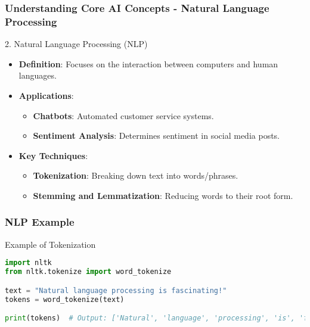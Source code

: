 \documentclass[aspectratio=169]{beamer}
\begin{document}
\begin{frame}[fragile]
    \frametitle{Understanding Core AI Concepts - Natural Language Processing}
    \begin{block}{2. Natural Language Processing (NLP)}
        \begin{itemize}
            \item \textbf{Definition}: Focuses on the interaction between computers and human languages.
            \item \textbf{Applications}:
            \begin{itemize}
                \item \textbf{Chatbots}: Automated customer service systems.
                \item \textbf{Sentiment Analysis}: Determines sentiment in social media posts.
            \end{itemize}
            \item \textbf{Key Techniques}:
            \begin{itemize}
                \item \textbf{Tokenization}: Breaking down text into words/phrases.
                \item \textbf{Stemming and Lemmatization}: Reducing words to their root form.
            \end{itemize}
        \end{itemize}
    \end{block}
\end{frame}

\begin{frame}[fragile]
    \frametitle{NLP Example}
    \begin{block}{Example of Tokenization}
        \begin{lstlisting}[language=Python]
import nltk
from nltk.tokenize import word_tokenize

text = "Natural language processing is fascinating!"
tokens = word_tokenize(text)

print(tokens)  # Output: ['Natural', 'language', 'processing', 'is', 'fascinating', '!']
        \end{lstlisting}
    \end{block}
\end{frame}
\end{document}
